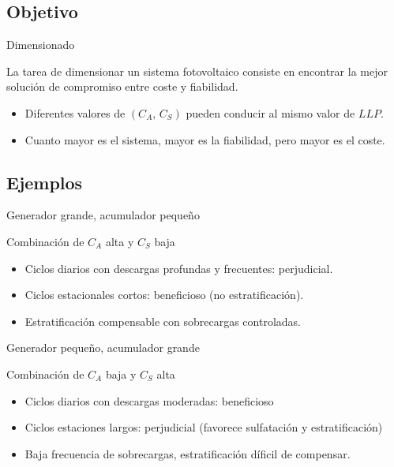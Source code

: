 \documentclass[xcolor={usenames,svgnames,dvipsnames}]{beamer}
\begin{document}
\subsection{Objetivo}
\label{sec:org333ca88}
\begin{frame}[label={sec:org402e44f}]{Dimensionado}
\begin{block}{La tarea de dimensionar un sistema fotovoltaico consiste en encontrar la mejor solución de compromiso entre coste y fiabilidad.}
\begin{itemize}
\item Diferentes valores de \((C_{A},\, C_{S})\) pueden conducir al mismo
valor de \(LLP\).

\item Cuanto mayor es el sistema, mayor es la fiabilidad, pero mayor es el
coste.
\end{itemize}
\end{block}
\end{frame}


\subsection{Ejemplos}
\label{sec:org95320f3}
\begin{frame}[label={sec:org36c7216}]{Generador grande, acumulador pequeño}
\begin{block}{Combinación de \(C_{A}\) alta y \(C_{S}\) baja}
\begin{itemize}
\item Ciclos diarios con descargas profundas y frecuentes: perjudicial.

\item Ciclos estacionales cortos: beneficioso (no estratificación).

\item Estratificación compensable con sobrecargas controladas.
\end{itemize}
\end{block}
\end{frame}

\begin{frame}[label={sec:org1ec38af}]{Generador pequeño, acumulador grande}
\begin{block}{Combinación de \(C_{A}\) baja y \(C_{S}\) alta}
\begin{itemize}
\item Ciclos diarios con descargas moderadas: beneficioso

\item Ciclos estaciones largos:  perjudicial (favorece sulfatación y estratificación)

\item Baja frecuencia de sobrecargas, estratificación díficil de compensar.
\end{itemize}
\end{block}
\end{frame}
\end{document}
